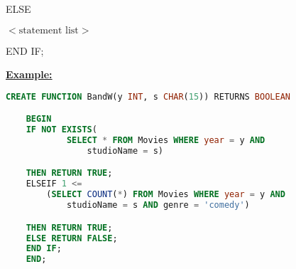 \documentclass[12pt]{article}
\begin{document}
\begin{enumerate}[1.]
\begin{enumerate}[a)]
\begin{itemize}
\begin{itemize}
                ELSE

                $<\text{statement list}>$

                END IF;
            \end{itemize}

            \bigskip

            \underline{\textbf{Example:}}

            \bigskip

    \begin{lstlisting}[language=SQL]
    CREATE FUNCTION BandW(y INT, s CHAR(15)) RETURNS BOOLEAN

    BEGIN
    IF NOT EXISTS(
            SELECT * FROM Movies WHERE year = y AND
                studioName = s)

    THEN RETURN TRUE;
    ELSEIF 1 <=
        (SELECT COUNT(*) FROM Movies WHERE year = y AND
            studioName = s AND genre = 'comedy')

    THEN RETURN TRUE;
    ELSE RETURN FALSE;
    END IF;
    END;
    \end{lstlisting}
        \end{itemize}

    \end{enumerate}
\end{enumerate}
\end{document}
